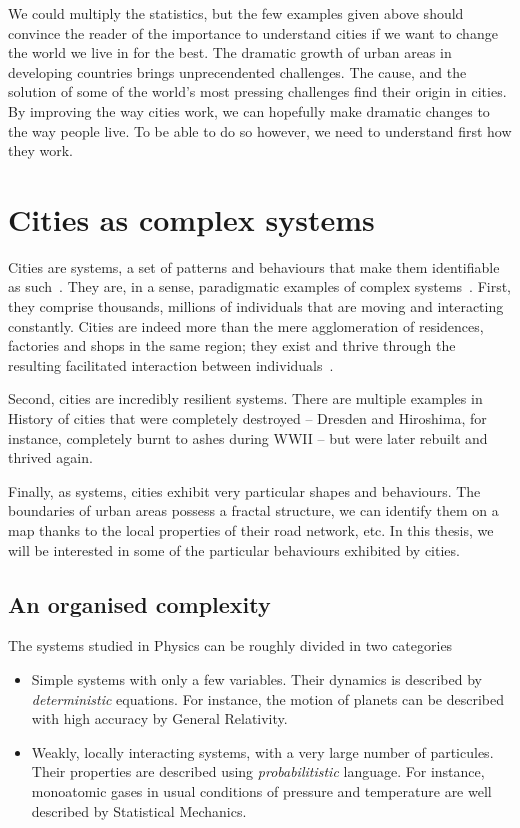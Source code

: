 We could multiply the statistics, but the few examples given above should
convince the reader of the importance to understand cities if we want to
change the world we live in for the best. The dramatic growth of urban areas in
developing countries brings unprecendented challenges. The cause, and the
solution of some of the world's most pressing challenges find their origin in
cities. By improving the way cities work, we can hopefully make dramatic changes
to the way people live. To be able to do so however, we need to understand first
how they work.\\


\section{Cities as complex systems}
\label{sec:cities_as_complex_systems}

Cities are systems, a set of patterns and behaviours that make them identifiable
as such~\cite{Dennett:1991}. They are, in a sense, paradigmatic examples of
complex systems~\cite{Ladyman:2013}. 
First, they comprise thousands, millions of individuals that are moving and
interacting constantly. Cities are indeed more than the mere agglomeration of
residences, factories and shops in the same region; they exist and thrive
through the resulting facilitated interaction between
individuals~\cite{Bettencourt:2013,Sim:2015}. 

Second, cities are incredibly resilient systems. There are multiple examples in
History of cities that were completely destroyed -- Dresden and Hiroshima, for
instance, completely burnt to ashes during WWII -- but were later rebuilt and
thrived again.

Finally, as systems, cities exhibit very particular shapes and behaviours. The
boundaries of urban areas possess a fractal structure, we can identify them on a
map thanks to the local properties of their road network, etc. In this thesis,
we will be interested in some of the particular behaviours exhibited by cities.\\


\subsection{An organised complexity}
\label{sub:an_organised_complexity}

The systems studied in Physics can be roughly divided in two
categories~\cite{Parisi:1999}

\begin{itemize}
    \item Simple systems with only a few variables. Their dynamics is described
        by \emph{deterministic} equations. For instance, the motion of planets
        can be described with high accuracy by General Relativity.
    \item Weakly, locally interacting systems, with a very large number of
        particules. Their properties are described using \emph{probabilitistic}
        language. For instance, monoatomic gases in usual conditions of pressure
        and temperature are well described by Statistical Mechanics.
\end{itemize}

